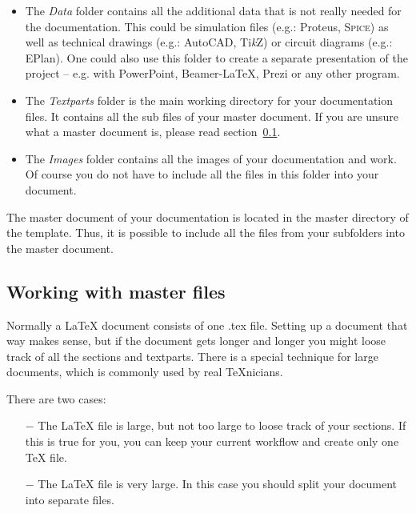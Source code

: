 \documentclass[12pt,paper=a4]{scrartcl}
\def\TikZ{Ti\textit{k}Z}
\begin{document}
\def\labelitemi{$>$}
\begin{itemize}

\item The \textit{Data} folder contains all the additional data that is not really needed
for the documentation. This could be simulation files (e.g.: Proteus, {\scshape Spice})
as well as technical drawings (e.g.: AutoCAD, \TikZ) or circuit diagrams (e.g.: EPlan).
One could also use this folder to create a separate presentation of the project -- e.g. with 
PowerPoint, Beamer-\LaTeX{}, Prezi or any other program.

\item The \textit{Textparts} folder is the main working directory for your documentation
files. It contains all the sub files of your master document. If you are unsure 
what a master document is, please read section~\ref{sec:master}.

\item The \textit{Images} folder contains all the images of your documentation and work. 
Of course you do not have to include all the files in this folder into your document.

\end{itemize}\bigskip

The master document of your documentation is located in the master directory
of the template. Thus, it is possible to include all the files from your subfolders
into the master document.\par \newpage

\subsection{Working with master files}\label{sec:master}

Normally a \LaTeX{} document consists of one {\ttfamily *.tex} file. 
Setting up a document that way makes sense,
but if the document gets longer and longer you might loose track of
all the sections and textparts. There is a special technique for
large documents, which is commonly used by real \TeX{}nicians.\par \bigskip


There are two cases:\par 
\begin{itemize}
\item[$-$] The \LaTeX{} file is large, but not too large to loose track of your sections. 
If this is true for you, you can keep your current workflow and create only one \TeX{} file.

\item[$-$] The \LaTeX{} file is very large. In this case you should split your document
into separate files.
\end{itemize}
\end{document}
